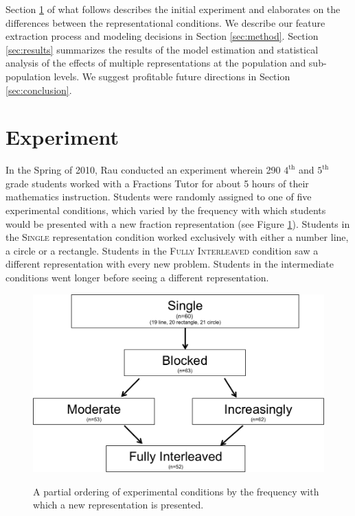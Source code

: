 \documentclass{edm_template}
\newcommand{\mgr}[1]{\textsc{#1}}
\begin{document}
Section \ref{sec:experiment} of what follows describes the initial experiment and elaborates on the differences between the representational conditions. We describe our feature extraction process and modeling decisions in Section \ref{sec:method}. Section \ref{sec:results} summarizes the results of the model estimation and statistical analysis of the effects of multiple representations at the population and sub-population levels. We  suggest profitable future directions in Section \ref{sec:conclusion}.

\section{Experiment}
\label{sec:experiment}

In the Spring of 2010, Rau conducted an experiment wherein 290 $4^\text{th}$ and $5^\text{th}$ grade students worked with a Fractions Tutor for about 5 hours of their mathematics instruction. Students were randomly assigned to one of five experimental conditions, which varied by the frequency with which students would be presented with a new fraction representation (see Figure \ref{fig:condition-graph}). Students in the \mgr{Single} representation condition worked exclusively with either a number line, a circle or a rectangle. Students in the \mgr{Fully Interleaved} condition saw a different representation with every new problem. Students in the intermediate conditions went longer before seeing a different representation.   
\begin{figure}[htbp]
\centering
\includegraphics[scale=.4]{conditionGraph.png}\\
\caption{A partial ordering of experimental conditions by the frequency with which a new representation is presented. }
\label{fig:condition-graph}
\end{figure}
\end{document}
